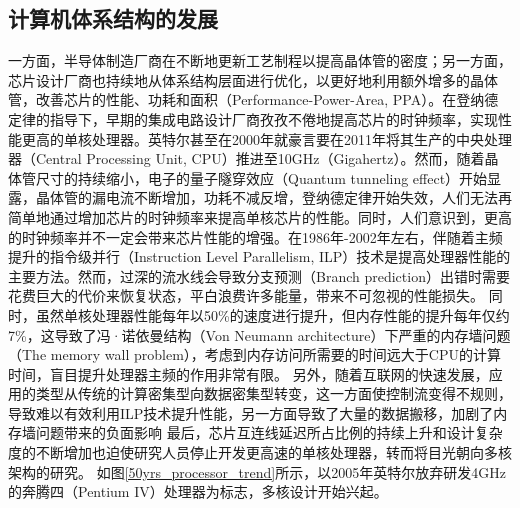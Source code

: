 \subsection{计算机体系结构的发展}

一方面，半导体制造厂商在不断地更新工艺制程以提高晶体管的密度；另一方面，芯片设计厂商也持续地从体系结构层面进行优化，以更好地利用额外增多的晶体管，改善芯片的性能、功耗和面积（Performance-Power-Area, PPA）。在登纳德定律的指导下，早期的集成电路设计厂商孜孜不倦地提高芯片的时钟频率，实现性能更高的单核处理器。英特尔甚至在2000年就豪言要在2011年将其生产的中央处理器（Central Processing Unit, CPU）推进至10GHz（Gigahertz）。然而，随着晶体管尺寸的持续缩小，电子的量子隧穿效应（Quantum tunneling effect）开始显露，晶体管的漏电流不断增加，功耗不减反增，登纳德定律开始失效，人们无法再简单地通过增加芯片的时钟频率来提高单核芯片的性能。同时，人们意识到，更高的时钟频率并不一定会带来芯片性能的增强。在1986年-2002年左右，伴随着主频提升的指令级并行（Instruction Level Parallelism, ILP）技术是提高处理器性能的主要方法。然而，过深的流水线会导致分支预测（Branch prediction）出错时需要花费巨大的代价来恢复状态，平白浪费许多能量，带来不可忽视的性能损失\cite{new_golden}。
同时，虽然单核处理器性能每年以50\%的速度进行提升，但内存性能的提升每年仅约7\%，这导致了冯·诺依曼结构（Von Neumann architecture）\cite{von_arch}下严重的内存墙问题（The memory wall problem）\cite{memory_wall}，考虑到内存访问所需要的时间远大于CPU的计算时间，盲目提升处理器主频的作用非常有限。
另外，随着互联网的快速发展，应用的类型从传统的计算密集型向数据密集型转变，这一方面使控制流变得不规则，导致难以有效利用ILP技术提升性能，另一方面导致了大量的数据搬移，加剧了内存墙问题带来的负面影响%
最后，芯片互连线延迟所占比例的持续上升和设计复杂度的不断增加也迫使研究人员停止开发更高速的单核处理器，转而将目光朝向多核架构的研究\cite{free_lauch_over}。
如图\ref{50yrs_processor_trend}所示\cite{50yrs_processor_trend}，以2005年英特尔放弃研发4GHz的奔腾四（Pentium IV）处理器为标志，多核设计开始兴起\cite{计算机体系结构基础}。

